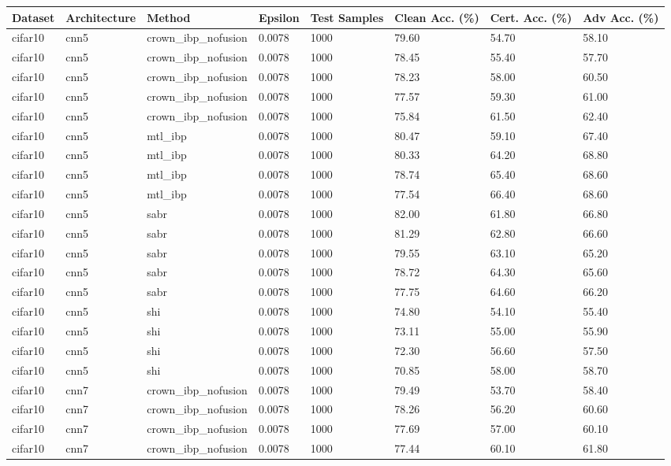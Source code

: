\begin{tabular}{llllllll}\toprule
Dataset & Architecture & Method & Epsilon & Test Samples & Clean Acc. (\%) & Cert. Acc. (\%) & Adv Acc. (\%) \\\midrule
cifar10 & cnn5 & crown\_ibp\_nofusion & 0.0078 & 1000 & 79.60 & 54.70 & 58.10 \\
cifar10 & cnn5 & crown\_ibp\_nofusion & 0.0078 & 1000 & 78.45 & 55.40 & 57.70 \\
cifar10 & cnn5 & crown\_ibp\_nofusion & 0.0078 & 1000 & 78.23 & 58.00 & 60.50 \\
cifar10 & cnn5 & crown\_ibp\_nofusion & 0.0078 & 1000 & 77.57 & 59.30 & 61.00 \\
cifar10 & cnn5 & crown\_ibp\_nofusion & 0.0078 & 1000 & 75.84 & 61.50 & 62.40 \\
cifar10 & cnn5 & mtl\_ibp & 0.0078 & 1000 & 80.47 & 59.10 & 67.40 \\
cifar10 & cnn5 & mtl\_ibp & 0.0078 & 1000 & 80.33 & 64.20 & 68.80 \\
cifar10 & cnn5 & mtl\_ibp & 0.0078 & 1000 & 78.74 & 65.40 & 68.60 \\
cifar10 & cnn5 & mtl\_ibp & 0.0078 & 1000 & 77.54 & 66.40 & 68.60 \\
cifar10 & cnn5 & sabr & 0.0078 & 1000 & 82.00 & 61.80 & 66.80 \\
cifar10 & cnn5 & sabr & 0.0078 & 1000 & 81.29 & 62.80 & 66.60 \\
cifar10 & cnn5 & sabr & 0.0078 & 1000 & 79.55 & 63.10 & 65.20 \\
cifar10 & cnn5 & sabr & 0.0078 & 1000 & 78.72 & 64.30 & 65.60 \\
cifar10 & cnn5 & sabr & 0.0078 & 1000 & 77.75 & 64.60 & 66.20 \\
cifar10 & cnn5 & shi & 0.0078 & 1000 & 74.80 & 54.10 & 55.40 \\
cifar10 & cnn5 & shi & 0.0078 & 1000 & 73.11 & 55.00 & 55.90 \\
cifar10 & cnn5 & shi & 0.0078 & 1000 & 72.30 & 56.60 & 57.50 \\
cifar10 & cnn5 & shi & 0.0078 & 1000 & 70.85 & 58.00 & 58.70 \\
cifar10 & cnn7 & crown\_ibp\_nofusion & 0.0078 & 1000 & 79.49 & 53.70 & 58.40 \\
cifar10 & cnn7 & crown\_ibp\_nofusion & 0.0078 & 1000 & 78.26 & 56.20 & 60.60 \\
cifar10 & cnn7 & crown\_ibp\_nofusion & 0.0078 & 1000 & 77.69 & 57.00 & 60.10 \\
cifar10 & cnn7 & crown\_ibp\_nofusion & 0.0078 & 1000 & 77.44 & 60.10 & 61.80 \\

\end{tabular}
